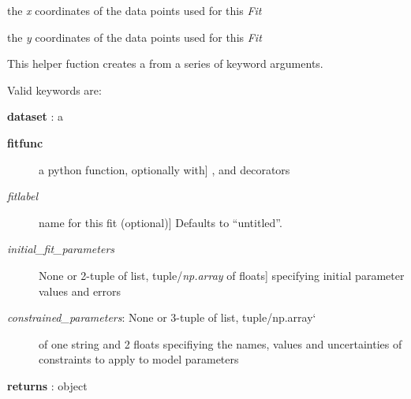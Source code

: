 \documentclass[a4paper,10pt,english]{sphinxmanual}
\begin{document}
\begin{fulllineitems}

\begin{fulllineitems}
\label{index:kafe.fit.Fit.xdata}
the \emph{x} coordinates of the data points used for this \emph{Fit}

\end{fulllineitems}


\begin{fulllineitems}
\label{index:kafe.fit.Fit.ydata}
the \emph{y} coordinates of the data points used for this \emph{Fit}

\end{fulllineitems}


\end{fulllineitems}


\begin{fulllineitems}
\label{index:kafe.fit.build_fit}
This helper fuction creates a  from a series of keyword arguments.

Valid keywords are:

\textbf{dataset} : a  
\begin{description}
\item[{\textbf{fitfunc}}] \leavevmode{[}a python function, optionally with{]}
,  and  decorators

\item[{\emph{fitlabel}}] \leavevmode{[}name for this fit (optional){]}
Defaults to ``untitled''.

\item[{\emph{initial\_fit\_parameters}}] \leavevmode{[}None or 2-tuple of list, tuple/\emph{np.array} of floats{]}
specifying initial parameter values and errors

\item[{\emph{constrained\_parameters}: None or 3-tuple of list, tuple/np.array{}`}] \leavevmode
of one string and 2 floats specifiying the names, values and
uncertainties of constraints to apply to model parameters

\end{description}

\textbf{returns} :  object

\end{fulllineitems}
\end{document}

